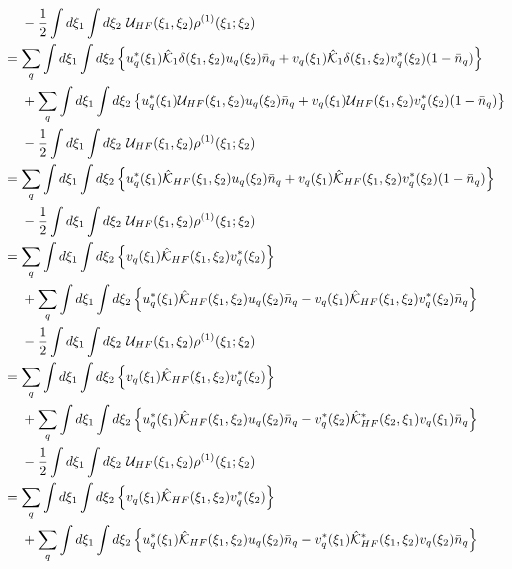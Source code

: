 \documentclass[dvipdfmx, 11pt, a4paper]{jsarticle}
\numberwithin{equation}{section}
\theoremstyle{definition}
\begin{document}
\begin{derivationBox}
\begin{align}
            &\ \ \ \ - \frac{1}{2}\int d\xi_1\int d\xi_2\ \mathcal{U}_{HF}(\xi_1,\xi_2)\rho^{(1)}(\xi_1;\xi_2) \notag \\
            &= \sum_q\int d\xi_1 \int d\xi_2 \left\{  u_q^*(\xi_1)\hat{\mathcal{K}}_1 \delta(\xi_1,\xi_2)u_q(\xi_2)\bar{n}_q+v_q(\xi_1)\hat{\mathcal{K}}_1\delta(\xi_1,\xi_2)v_q^*(\xi_2)(1-\bar{n}_q) \right\}   \notag \\
            &\ \ \ \ + \sum_q \int d\xi_1\int d\xi_2 \left\{ u_q^*(\xi_1)\mathcal{U}_{HF}(\xi_1,\xi_2)u_q(\xi_2)\bar{n}_q+v_q(\xi_1)\mathcal{U}_{HF}(\xi_1,\xi_2)v_q^*(\xi_2)(1-\bar{n}_q) \right\} \notag \\
            &\ \ \ \ - \frac{1}{2}\int d\xi_1\int d\xi_2\ \mathcal{U}_{HF}(\xi_1,\xi_2)\rho^{(1)}(\xi_1;\xi_2) \notag \\
            &=\sum_q\int d\xi_1 \int d\xi_2 \left\{  u_q^*(\xi_1)\hat{\mathcal{K}}_{HF} (\xi_1,\xi_2)u_q(\xi_2)\bar{n}_q+v_q(\xi_1)\hat{\mathcal{K}}_{HF}(\xi_1,\xi_2)v_q^*(\xi_2)(1-\bar{n}_q) \right\}   \notag \\
            &\ \ \ \ - \frac{1}{2}\int d\xi_1\int d\xi_2\ \mathcal{U}_{HF}(\xi_1,\xi_2)\rho^{(1)}(\xi_1;\xi_2) \notag \\
            &=\sum_q\int d\xi_1 \int d\xi_2 \left\{  v_q(\xi_1)\hat{\mathcal{K}}_{HF}(\xi_1,\xi_2)v_q^*(\xi_2) \right\}   \notag \\
            &\ \ \ \ +\sum_q\int d\xi_1 \int d\xi_2 \left\{  u_q^*(\xi_1)\hat{\mathcal{K}}_{HF} (\xi_1,\xi_2)u_q(\xi_2)\bar{n}_q-v_q(\xi_1)\hat{\mathcal{K}}_{HF}(\xi_1,\xi_2)v_q^*(\xi_2)\bar{n}_q \right\}   \notag \\
            &\ \ \ \ - \frac{1}{2}\int d\xi_1\int d\xi_2\ \mathcal{U}_{HF}(\xi_1,\xi_2)\rho^{(1)}(\xi_1;\xi_2) \notag \\
            &=\sum_q\int d\xi_1 \int d\xi_2 \left\{  v_q(\xi_1)\hat{\mathcal{K}}_{HF}(\xi_1,\xi_2)v_q^*(\xi_2) \right\}   \notag \\
            &\ \ \ \ +\sum_q\int d\xi_1 \int d\xi_2 \left\{  u_q^*(\xi_1)\hat{\mathcal{K}}_{HF} (\xi_1,\xi_2)u_q(\xi_2)\bar{n}_q-v_q^*(\xi_2)\hat{\mathcal{K}}_{HF}^*(\xi_2,\xi_1)v_q(\xi_1)\bar{n}_q \right\}   \notag \\
            &\ \ \ \ - \frac{1}{2}\int d\xi_1\int d\xi_2\ \mathcal{U}_{HF}(\xi_1,\xi_2)\rho^{(1)}(\xi_1;\xi_2) \notag \\
            &=\sum_q\int d\xi_1 \int d\xi_2 \left\{  v_q(\xi_1)\hat{\mathcal{K}}_{HF}(\xi_1,\xi_2)v_q^*(\xi_2) \right\}   \notag \\
            &\ \ \ \ +\sum_q\int d\xi_1 \int d\xi_2 \left\{  u_q^*(\xi_1)\hat{\mathcal{K}}_{HF} (\xi_1,\xi_2)u_q(\xi_2)\bar{n}_q-v_q^*(\xi_1)\hat{\mathcal{K}}_{HF}^*(\xi_1,\xi_2)v_q(\xi_2)\bar{n}_q \right\}   \notag \\

\end{align}
\end{derivationBox}
\end{document}

